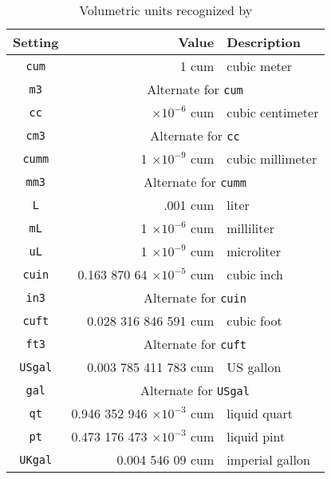 \begin{table}
\centering
\caption{Volumetric units recognized by \PM}\label{tab:volume}
\begin{tabular}{crl}
\hline
Setting & Value & Description\\
\hline
\verb|cum| & 1 cum & cubic meter\\
\verb|m3| & \multicolumn{2}{c}{Alternate for \texttt{cum}}\\
\verb|cc| & $\times 10^{-6}$ cum & cubic centimeter\\
\verb|cm3| & \multicolumn{2}{c}{Alternate for \texttt{cc}}\\
\verb|cumm| & 1 $\times 10^{-9}$ cum & cubic millimeter\\
\verb|mm3| & \multicolumn{2}{c}{Alternate for \texttt{cumm}}\\
\verb|L| & .001 cum & liter\\
\verb|mL| & 1 $\times 10^{-6}$ cum & milliliter\\
\verb|uL| & 1 $\times 10^{-9}$ cum & microliter\\
\verb|cuin| & 0.163 870 64 $\times 10^{-5}$ cum & cubic inch\\
\verb|in3| & \multicolumn{2}{c}{Alternate for \texttt{cuin}}\\
\verb|cuft| & 0.028 316 846 591 cum & cubic foot\\
\verb|ft3| & \multicolumn{2}{c}{Alternate for \texttt{cuft}}\\
\verb|USgal| & 0.003 785 411 783 cum & US gallon\\
\verb|gal| & \multicolumn{2}{c}{Alternate for \texttt{USgal}}\\
\verb|qt| & 0.946 352 946 $\times 10^{-3}$ cum & liquid quart\\
\verb|pt| & 0.473 176 473 $\times 10^{-3}$ cum & liquid pint\\
\verb|UKgal| & 0.004 546 09 cum & imperial gallon\\
\hline
\end{tabular}
\end{table}
